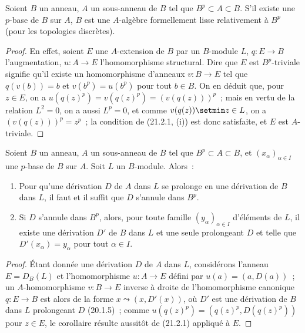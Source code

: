 \begin{corollary}[21.2.2]
\label{0.21.2.2-fr}
Soient $B$ un anneau, $A$ un sous-anneau de $B$ tel que $B^p\subset A\subset B$.
S'il existe une $p$-base de $B$ sur $A$, $B$ est une $A$-algèbre formellement
lisse relativement à $B^p$ (pour les topologies discrètes).
\end{corollary}

\begin{proof}
En effet, soient $E$ une $A$-extension de $B$ par un $B$-module $L$, $q:E\to B$
l'augmentation, $u:A\to E$ l'homomorphisme structural. Dire que $E$ est
$B^p$-triviale signifie qu'il existe un homomorphisme d'anneaux $v:B\to E$
tel que $q(v(b))=b$ et $v(b^p)=u(b^p)$ pour tout $b\in B$. On en déduit que,
pour $z\in E$, on a $u(q(z)^p)=v(q(z)^p)=(v(q(z)))^p$~; mais en vertu de
la relation $L^2=0$, on a aussi $L^p=0$, et comme $v(q(z))\setmin z\in L$, on a
$(v(q(z)))^p=z^p$~; la condition de (21.2.1, (i)) est donc satisfaite, et
$E$ est $A$-triviale.
\end{proof}

\begin{corollary}[21.2.3]
\label{0.21.2.3-fr}
Soient $B$ un anneau, $A$ un sous-anneau de $B$ tel que $B^p\subset A\subset B$,
et $\left(x_\alpha\right)_{\alpha\in I}$ une $p$-base de $B$ sur $A$. Soit
$L$ un $B$-module. Alors~:
\begin{enumerate}
  \item[\textup{(i)}] Pour qu'une dérivation $D$ de $A$ dans $L$ se prolonge en une
  dérivation de $B$ dans $L$, il faut et il suffit que $D$ s'annule dans $B^p$.
  \item[\textup{(ii)}] Si $D$ s'annule dans $B^p$, alors, pour toute famille
  $(y_\alpha)_{\alpha\in I}$ d'éléments de $L$, il existe une dérivation
  $D'$ de $B$ dans $L$ et une seule prolongeant $D$ et telle que
  $D'(x_\alpha)=y_\alpha$ pour tout $\alpha\in I$.
\end{enumerate}
\end{corollary}

\begin{proof}
Étant donnée une dérivation $D$ de $A$ dans $L$, considérons l'anneau
$E=D_B(L)$ et l'homomorphisme $u:A\to E$ défini par $u(a)=(a,D(a))$~; un
$A$-homomorphisme $v:B\to E$ inverse à droite de l'homomorphisme canonique
$q:E\to B$ est alors de la forme $x\leadsto(x,D'(x))$, où $D'$ est une
dérivation de $B$ dans $L$ prolongeant $D$ (20.1.5)~; comme
$u(q(z)^p)=(q(z)^p,D(q(z)^p))$ pour $z\in E$, le corollaire résulte aussitôt
de (21.2.1) appliqué à $E$.
\end{proof}

